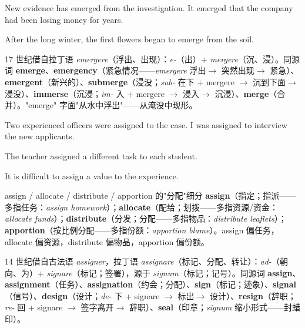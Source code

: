 \documentclass[../main.tex]{subfiles}
\begin{document}
{New evidence has emerged from the investigation.}
{It emerged that the company had been losing money for years.}

{After the long winter, the first flowers began to emerge from the soil.}

\begin{origin}
17 世纪借自拉丁语 \textit{emergere}（浮出、出现）：\textit{e-}（出）+ \textit{mergere}（沉、浸）。同源词 \textbf{emerge}、\textbf{emergency}（紧急情况——\textit{emergere} 浮出$\to$ 突然出现$\to$ 紧急）、\textbf{emergent}（新兴的）、\textbf{submerge}（浸没；\textit{sub-} 在下 + mergere $\to$ 沉到下面$\to$ 浸没）、\textbf{immerse}（沉浸；\textit{im-} 入 + mergere $\to$ 浸入$\to$ 沉浸）、\textbf{merge}（合并）。"emerge" 字面"从水中浮出"——从淹没中现形。
\end{origin}


{Two experienced officers were assigned to the case.}
{I was assigned to interview the new applicants.}

{The teacher assigned a different task to each student.}

{It is difficult to assign a value to the experience.}

\begin{gram}{assign / allocate / distribute / apportion 的"分配"细分}
\textbf{assign}（指定；指派——多指任务：\textit{assign homework}）；\textbf{allocate}（配给；划拨——多指资源/资金：\textit{allocate funds}）；\textbf{distribute}（分发；分配——多指物品：\textit{distribute leaflets}）；\textbf{apportion}（按比例分配——多指份额：\textit{apportion blame}）。assign 偏任务，allocate 偏资源，distribute 偏物品，apportion 偏份额。
\end{gram}

\begin{origin}
14 世纪借自古法语 \textit{assigner}，拉丁语 \textit{assignare}（标记、分配、转让）：\textit{ad-}（朝向、为）+ \textit{signare}（标记；签署），源于 \textit{signum}（标记；记号）。同源词 \textbf{assign}、\textbf{assignment}（任务）、\textbf{assignation}（约会；分配）、\textbf{sign}（标记；迹象）、\textbf{signal}（信号）、\textbf{design}（设计；\textit{de-} 下 + signare $\to$ 标出$\to$ 设计）、\textbf{resign}（辞职；\textit{re-} 回 + signare $\to$ 签字离开$\to$ 辞职）、\textbf{seal}（印章；\textit{signum} 缩小形式——封蜡印）。
\end{origin}
\end{document}
